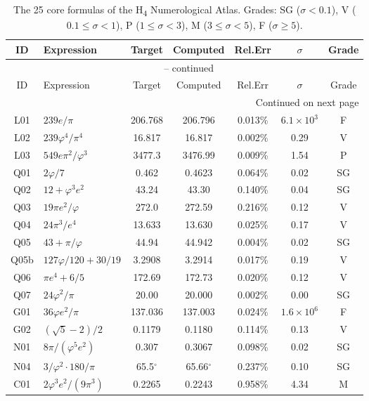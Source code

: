 \documentclass[11pt,a4paper]{article}
\begin{document}
\begin{longtable}{clccccc}
\caption{The 25 core formulas of the H\textsubscript{4} Numerological Atlas.
  Grades: SG ($\sigma<0.1$), V ($0.1\le\sigma<1$), P ($1\le\sigma<3$),
  M ($3\le\sigma<5$), F ($\sigma\ge 5$).}
\label{tab:formulas} \\
\toprule
ID & Expression & Target & Computed & Rel.Err & $\sigma$ & Grade \\
\midrule
\endfirsthead
\multicolumn{7}{c}{\tablename\ \thetable{} -- continued} \\
\toprule
ID & Expression & Target & Computed & Rel.Err & $\sigma$ & Grade \\
\midrule
\endhead
\midrule
\multicolumn{7}{r}{Continued on next page} \\
\endfoot
\bottomrule
\endlastfoot
L01 & $239e/\pi$ & 206.768 & 206.796 & 0.013\% & $6.1\times10^{3}$ & F \\
L02 & $239\varphi^{4}/\pi^{4}$ & 16.817 & 16.817 & 0.002\% & 0.29 & V \\
L03 & $549e\pi^{2}/\varphi^{3}$ & 3477.3 & 3476.99 & 0.009\% & 1.54 & P \\
Q01 & $2\varphi/7$ & 0.462 & 0.4623 & 0.064\% & 0.02 & SG \\
Q02 & $12+\varphi^{3}e^{2}$ & 43.24 & 43.30 & 0.140\% & 0.04 & SG \\
Q03 & $19\pi e^{2}/\varphi$ & 272.0 & 272.59 & 0.216\% & 0.12 & V \\
Q04 & $24\pi^{3}/e^{4}$ & 13.633 & 13.630 & 0.025\% & 0.17 & V \\
Q05 & $43+\pi/\varphi$ & 44.94 & 44.942 & 0.004\% & 0.02 & SG \\
Q05b& $127\varphi/120+30/19$ & 3.2908 & 3.2914 & 0.017\% & 0.19 & V \\
Q06 & $\pi e^{4}+6/5$ & 172.69 & 172.73 & 0.020\% & 0.12 & V \\
Q07 & $24\varphi^{2}/\pi$ & 20.00 & 20.000 & 0.002\% & 0.00 & SG \\
G01 & $36\varphi e^{2}/\pi$ & 137.036 & 137.003 & 0.024\% & $1.6\times10^{6}$ & F \\
G02 & $(\sqrt{5}-2)/2$ & 0.1179 & 0.1180 & 0.114\% & 0.13 & V \\
N01 & $8\pi/(\varphi^{5}e^{2})$ & 0.307 & 0.3067 & 0.098\% & 0.02 & SG \\
N04 & $3/\varphi^{2}\cdot180/\pi$ & 65.5$^{\circ}$ & 65.66$^{\circ}$ & 0.237\% & 0.10 & SG \\
C01 & $2\varphi^{3}e^{2}/(9\pi^{3})$ & 0.2265 & 0.2243 & 0.958\% & 4.34 & M \\

\end{longtable}
\end{document}

